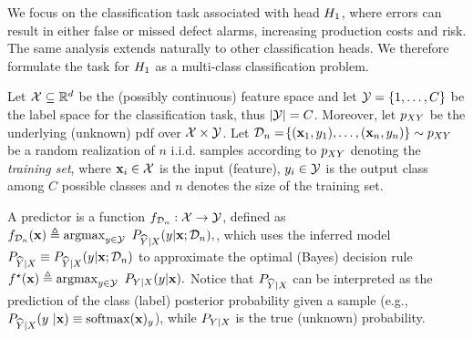 We focus on the classification task associated with head \(H_{1}\), where errors can result in either false or missed defect alarms, increasing production costs and risk. The same analysis extends naturally to other classification heads. We therefore formulate the task for \(H_{1}\) as a multi-class classification problem.

% 

Let \(\mathcal{X}\subseteq\mathbb{R}^d\) be the (possibly continuous) feature space and let  \(\mathcal{Y}=\{1,\dots,C\}\) be the label space for the classification task, thus \(\left| \mathcal{Y} \right|=C\). Moreover, let \(p_{XY}\) be the underlying (unknown) \gls*{pdf} over \(\mathcal{X}\times\mathcal{Y}\).
Let \(\mathcal{D}_{n} = \!\left\{( \mathbf{x}_1, y_1),\dots,( \mathbf{x}_n, y_n)\right\}\sim p_{XY}\) be a random realization of $n$ i.i.d. samples according to \(p_{XY}\)  denoting the \textit{training set}, where \(\mathbf{x}_i \in \mathcal{X}\) is the input (feature), \(y_i \in \mathcal{Y}\) is the output class among $C$ possible classes and $n$ denotes the size of the training set.

A predictor is a function \({f}_{\mathcal{D}_{n}}: \mathcal{X}\rightarrow\mathcal{Y}\), defined as \(
f_{\calD_{n}}(\x) \triangleq \argmax_{y\in\calY}~\PYXhat(y|\x;\calD_{n}),
\), which uses the inferred model \(P_{\widehat{Y}|{X}}\equiv P_{\widehat{Y}|{X}}(y|\mathbf{x};\mathcal{D}_{n})\) to approximate the optimal (Bayes) decision rule
\(
f^\star(\x)  \triangleq   \argmax_{y\in\calY}~\PYX(y|\x).
\)
Notice that $P_{\widehat{Y}|{X}}$ can be interpreted as the prediction of the class (label) posterior probability given a sample (e.g., \(P_{\widehat{Y}|{X}}(y~|\mathbf{x})\equiv \text{softmax}(\mathbf{\mathbf{x}})_y\)), while \(P_{Y|X}\) is the true (unknown)  probability.


